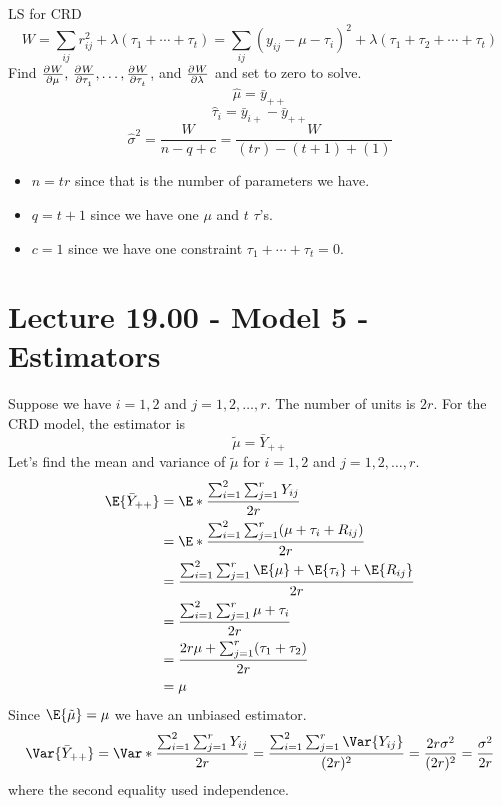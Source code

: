 \begin{Example}{LS for CRD}{}
    \[ W=\sum_{ij}r_{ij}^2+\lambda(\tau_1+\cdots+\tau_t)=
        \sum_{ij}(y_{ij}-\mu-\tau_i)^2+\lambda(\tau_1+\tau_2+\cdots+\tau_t)   \]
    Find $ \pd{W}{\mu},\, \pd{W}{\tau_1},\ldots,\pd{W}{\tau_t} $, and $ \pd{W}{\lambda} $
    and set to zero to solve.
    \[ \hat{\mu}=\bar{y}_{++} \]
    \[ \hat{\tau}_i=\bar{y}_{i+}-\bar{y}_{++} \]
    \[ \hat{\sigma}^2=\frac{W}{n-q+c}=\frac{W}{(tr)-(t+1)+(1)} \]
    \begin{itemize}
        \item $ n=tr $ since that is the number of parameters we have.
        \item $ q=t+1 $ since we have one $ \mu $ and $ t $ $ \tau $'s.
        \item $ c=1 $ since we have one constraint $ \tau_1+\cdots+\tau_t=0 $.
    \end{itemize}
\end{Example}
\section{Lecture 19.00 - Model 5 - Estimators}
Suppose we have $ i=1,2 $ and $ j=1,2,\ldots,r $.
The number of units is $ 2r $. For the CRD model, the estimator is
\[ \tilde{\mu}=\bar{Y}_{++} \]
Let's find the mean and variance of $ \tilde{\mu} $ for $ i=1,2 $ and
$ j=1,2,\ldots,r $.
\begin{align*}
    \E{\bar{Y}_{++}}
     & =\E*{\frac{\sum_{i=1}^{2} \sum_{j=1}^{r} Y_{ij}}{2r} }                  \\
     & =\E*{\frac{\sum_{i=1}^{2} \sum_{j=1}^{r} (\mu+\tau_i+R_{ij})}{2r} }     \\
     & =\frac{\sum_{i=1}^{2} \sum_{j=1}^{r} \E{\mu}+\E{\tau_i}+\E{R_{ij}}}{2r} \\
     & =\frac{\sum_{i=1}^{2} \sum_{j=1}^{r} \mu+\tau_i}{2r}                    \\
     & =\frac{2r\mu+\sum_{j=1}^{r} (\tau_1+\tau_2)}{2r}                        \\
     & =\mu
\end{align*}
Since $ \E{\tilde{\mu}}=\mu $ we have an unbiased estimator.
\[ \Var{\bar{Y}_{++}}
    =\Var*{\frac{\sum_{i=1}^{2} \sum_{j=1}^{r} Y_{ij}}{2r} }
    =\frac{\sum_{i=1}^{2} \sum_{j=1}^{r} \Var{Y_{ij}}}{(2r)^2}
    =\frac{2r\sigma^2}{(2r)^2}
    =\frac{\sigma^2}{2r}  \]
where the second equality used independence.

